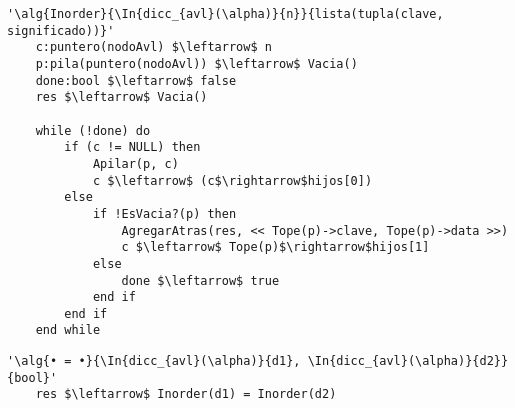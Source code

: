 \begin{lstlisting}[mathescape]
'\alg{Inorder}{\In{dicc_{avl}(\alpha)}{n}}{lista(tupla(clave, significado))}'
	c:puntero(nodoAvl) $\leftarrow$ n
	p:pila(puntero(nodoAvl)) $\leftarrow$ Vacia()
	done:bool $\leftarrow$ false
	res $\leftarrow$ Vacia()

	while (!done) do
		if (c != NULL) then
			Apilar(p, c)
			c $\leftarrow$ (c$\rightarrow$hijos[0])
		else
			if !EsVacia?(p) then
				AgregarAtras(res, << Tope(p)->clave, Tope(p)->data >>)
				c $\leftarrow$ Tope(p)$\rightarrow$hijos[1]
			else
				done $\leftarrow$ true
			end if
		end if
	end while
\end{lstlisting}

\begin{lstlisting}[mathescape]
'\alg{• = •}{\In{dicc_{avl}(\alpha)}{d1}, \In{dicc_{avl}(\alpha)}{d2}}{bool}'
	res $\leftarrow$ Inorder(d1) = Inorder(d2)
\end{lstlisting}
